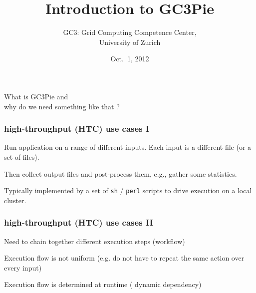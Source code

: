 \documentclass[english,serif,mathserif,xcolor=pdftex,dvipsnames,table]{beamer}
\title[Introduction to GC3Pie]{%
  Introduction to GC3Pie
}
\author[Sergio Maffioletti]{%
  GC3: Grid Computing Competence Center, \\
  University of Zurich
}
\date{Oct.~1, 2012}
\begin{document}
\maketitle



\begin{frame}
  \begin{center}
    \huge{What is {\color{Blue} GC3Pie} and \\ why do we need something like that ?}
  \end{center}
\end{frame}

\begin{frame}
  \frametitle{high-throughput (HTC) use cases I}

  \begin{block}{}
    Run application on a {\color{Blue} range} of different inputs.
    Each input is a different file (or a set of files).
  \end{block}

  \begin{block}{}
    Then {\color{Blue} collect} output files and post-process them, e.g., gather some
    statistics.
  \end{block}

  \begin{block}{}
    Typically implemented by a set of \texttt{sh} / \texttt{perl} scripts to drive
    execution on a local cluster.
  \end{block}
\end{frame}

\begin{frame}
  \frametitle{high-throughput (HTC) use cases II}

  \begin{block}{}
    Need to {\color{Blue} chain together} different execution steps
    (workflow)
  \end{block}

  \begin{block}{}
    Execution flow is not {\color{Blue} uniform} (e.g. do not have to
    repeat the same action over every input)
  \end{block}

  \begin{block}{}
    Execution flow is determined at runtime ({\color{Blue} dynamic
    dependency})
  \end{block}

\end{frame}
\end{document}
